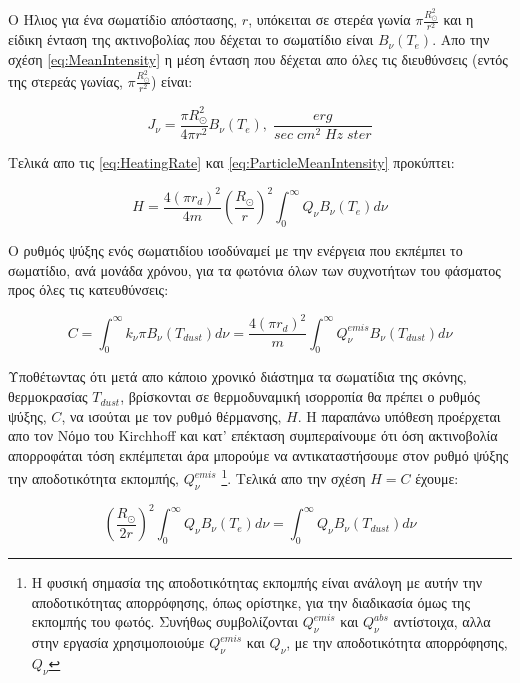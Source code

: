Ο Ήλιος για ένα σωματίδiο απόστασης, $r$, υπόκειται σε στερέα γωνία $\pi \frac{R_{\odot}^2}{r^2}$ και η είδικη ένταση της ακτινοβολίας που δέχεται το σωματίδιο είναι $B_{\nu}(T_{e})$. Απο την σχέση \eqref{eq:MeanIntensity} η μέση ένταση που δέχεται απο όλες τις διευθύνσεις (εντός της στερεάς γωνίας, $\pi \frac{R_{\odot}^2}{r^2}$) είναι:

\begin{equation}\label{eq:ParticleMeanIntensity}
 J_{\nu}=\frac{\pi R_{\odot}^2}{4 \pi r^2} B_{\nu}(T_{e}), \; \frac{erg}{sec \; cm^2 \; Hz \; ster} 
\end{equation}

Τελικά απο τις \eqref{eq:HeatingRate} και \eqref{eq:ParticleMeanIntensity} προκύπτει:

\begin{equation}\label{eq:HeatingRate2}
H = \frac{4(\pi r_{d})^2}{4m} (\frac{R_{\odot}}{r})^2 \int_{0}^{\infty} Q_{\nu}B_{\nu}(T_{e}) d\nu  
\end{equation}

Ο ρυθμός ψύξης ενός σωματιδίου ισοδύναμεί με την ενέργεια που εκπέμπει το σωματίδιο, ανά μονάδα χρόνου, για τα φωτόνια όλων των συχνοτήτων του φάσματος προς όλες τις κατευθύνσεις:

\begin{equation}\label{eq:CoolingRate2}
C = \int_{0}^{\infty} k_{\nu} \pi B_{\nu}(T_{dust}) d\nu = \frac{4(\pi r_{d})^2}{m} \int_{0}^{\infty} Q_{\nu}^{emis} B_{\nu}(T_{dust}) d\nu  
\end{equation}

Υποθέτωντας ότι μετά απο κάποιο χρονικό διάστημα τα σωματίδια της σκόνης, θερμοκρασίας $T_{dust}$, βρίσκονται σε θερμοδυναμική ισορροπία θα πρέπει ο ρυθμός ψύξης, $C$, να ισούται με τον ρυθμό θέρμανσης, $H$. Η παραπάνω υπόθεση προέρχεται απο τον Νόμο του {\en Kirchhoff} και κατ' επέκταση συμπεραίνουμε ότι όση ακτινοβολία απορροφάται τόση εκπέμπεται άρα μπορούμε να αντικαταστήσουμε στον ρυθμό ψύξης την αποδοτικότητα εκπομπής, $Q_{\nu}^{emis}$ \footnote{Η φυσική σημασία της αποδοτικότητας εκπομπής είναι ανάλογη με αυτήν την αποδοτικότητας απορρόφησης, όπως ορίστηκε, για την διαδικασία όμως της εκπομπής του φωτός. Συνήθως συμβολίζονται $Q_{\nu}^{emis}$ και $Q_{\nu}^{abs}$ αντίστοιχα, αλλα στην εργασία χρησιμοποιούμε $Q_{\nu}^{emis}$ και $Q_{\nu}$, με την  αποδοτικότητα απορρόφησης, $Q_{\nu}$}. Τελικά απο την σχέση $H=C$ έχουμε:

\begin{equation}\label{eq:CalcTdust}
(\frac{R_{\odot}}{2r})^2 \int_{0}^{\infty} Q_{\nu} B_{\nu}(T_{e}) d\nu = \int_{0}^{\infty} Q_{\nu} B_{\nu}(T_{dust}) d\nu 
\end{equation}


